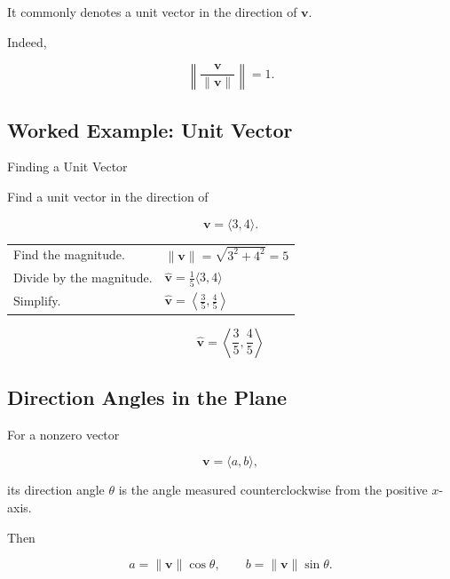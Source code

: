 It commonly denotes a unit vector in the direction of \(\mathbf{v}\).

Indeed,

\[
\left\|
\frac{\mathbf{v}}{\|\mathbf{v}\|}
\right\|
=
1.
\]

\subsection{Worked Example: Unit Vector}
\label{subsec:worked-unit-vector}

\begin{workedexamplebox}{Finding a Unit Vector}

Find a unit vector in the direction of

\[ \mathbf{v}=\langle3,4\rangle. \]

\begin{tabularx}{\textwidth}{@{}>{\raggedright\arraybackslash}p{}X@{}}
Find the magnitude. &
\(\|\mathbf{v}\|=\sqrt{3^2+4^2}=5\)\\
Divide by the magnitude. &
\(\widehat{\mathbf{v}}=\frac15\langle3,4\rangle\)\\
Simplify. &
\(\widehat{\mathbf{v}}=\left\langle\frac35,\frac45\right\rangle\)
\end{tabularx}

\begin{answerbox}
\[ \boxed{\widehat{\mathbf{v}}=\left\langle\frac35,\frac45\right\rangle} \]
\end{answerbox}
\end{workedexamplebox}

\subsection{Direction Angles in the Plane}
\label{subsec:vector-direction-angle}

For a nonzero vector

\[ \mathbf{v}=\langle a,b\rangle, \]

its direction angle \(\theta\) is the angle measured counterclockwise from
the positive \(x\)-axis.

Then

\[ \boxed{a=\|\mathbf{v}\|\cos\theta,\qquad b=\|\mathbf{v}\|\sin\theta.} \]

